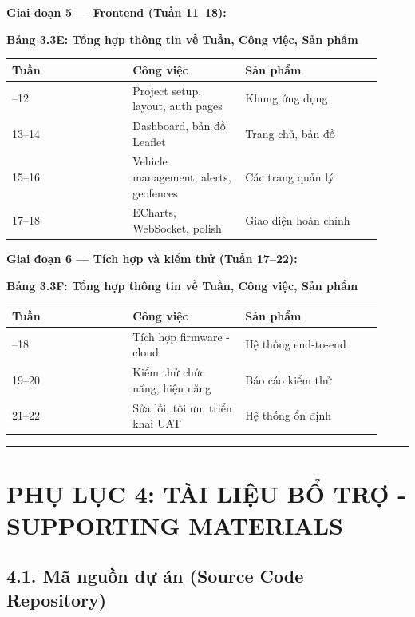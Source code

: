 \documentclass[13pt,a4paper]{extarticle}
\newcounter{none} %
\newcommand{\thesislongtableorignewline}{}
\let\thesislongtableorignewline\\
\renewcommand{\\}{\thesislongtableorignewline\hline}%
\let\\\thesislongtableorignewline
\newcommand{\appendixsection}[1]{\clearpage\section{#1}}
\newcommand{\thesistabletitle}[1]{%
  \begin{center}\textbf{#1}\end{center}%
}
\begin{document}
\textbf{Giai đoạn 5 --- Frontend (Tuần 11--18):}

{\def\LTcaptype{none} %
\thesistabletitle{Bảng 3.3E: Tổng hợp thông tin về Tuần, Công việc, Sản phẩm}

\begin{longtable}{|p{0.30\linewidth}|p{0.28\linewidth}|p{0.34\linewidth}|}
\hline \textbf{Tuần} & \textbf{Công việc} & \textbf{Sản phẩm} \\
\hline
\endhead
\hline
\endlastfoot
11--12 & Project setup, layout, auth pages & Khung ứng dụng \\
13--14 & Dashboard, bản đồ Leaflet & Trang chủ, bản đồ \\
15--16 & Vehicle management, alerts, geofences & Các trang quản lý \\
17--18 & ECharts, WebSocket, polish & Giao diện hoàn chỉnh \\
\end{longtable}
}

\textbf{Giai đoạn 6 --- Tích hợp và kiểm thử (Tuần 17--22):}

{\def\LTcaptype{none} %
\thesistabletitle{Bảng 3.3F: Tổng hợp thông tin về Tuần, Công việc, Sản phẩm}

\begin{longtable}{|p{0.30\linewidth}|p{0.28\linewidth}|p{0.34\linewidth}|}
\hline \textbf{Tuần} & \textbf{Công việc} & \textbf{Sản phẩm} \\
\hline
\endhead
\hline
\endlastfoot
17--18 & Tích hợp firmware - cloud & Hệ thống end-to-end \\
19--20 & Kiểm thử chức năng, hiệu năng & Báo cáo kiểm thử \\
21--22 & Sửa lỗi, tối ưu, triển khai UAT & Hệ thống ổn định \\
\end{longtable}
}

\begin{center}\rule{0.5\linewidth}{0.5pt}\end{center}

\appendixsection{PHỤ LỤC 4: TÀI LIỆU BỔ TRỢ - SUPPORTING
MATERIALS}\label{phux1ee5-lux1ee5c-4-tuxe0i-liux1ec7u-bux1ed5-trux1ee3---supporting-materials}

\subsection{4.1. Mã nguồn dự án (Source Code
Repository)}\label{41-muxe3-nguux1ed3n-dux1ef1-uxe1n-source-code-repository}
\end{document}
